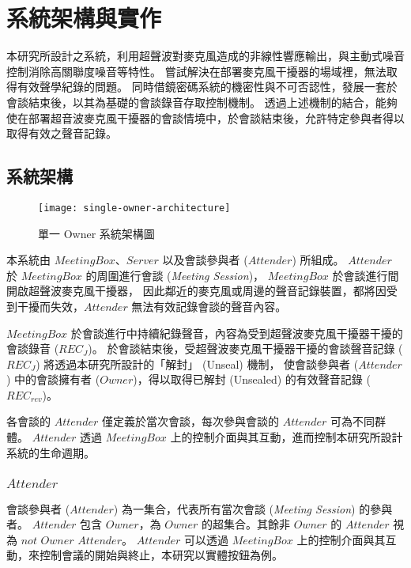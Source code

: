 \chapter{系統架構與實作}

    本研究所設計之系統，利用超聲波對麥克風造成的非線性響應輸出，與主動式噪音控制消除高關聯度噪音等特性。
嘗試解決在部署麥克風干擾器的場域裡，無法取得有效聲學紀錄的問題。
同時借鏡密碼系統的機密性與不可否認性，發展一套於會談結束後，以其為基礎的會談錄音存取控制機制。
透過上述機制的結合，能夠使在部署超音波麥克風干擾器的會談情境中，於會談結束後，允許特定參與者得以取得有效之聲音記錄。


\section{系統架構}

\begin{figure}[H]
    \centering
    \texttt{[image: single-owner-architecture]}
    \caption{單一 Owner 系統架構圖}
    \label{fig.s-o-arch}
\end{figure}

    本系統由 $MeetingBox$、$Server$ 以及會談參與者 ($Attender$) 所組成。
$Attender$ 於 $MeetingBox$ 的周圍進行會談 ({\it Meeting Session})，
$MeetingBox$ 於會談進行間開啟超聲波麥克風干擾器，
因此鄰近的麥克風或周邊的聲音記錄裝置，都將因受到干擾而失效，$Attender$ 無法有效記錄會談的聲音內容。

    $MeetingBox$ 於會談進行中持續紀錄聲音，內容為受到超聲波麥克風干擾器干擾的會談錄音 ($REC_{J}$)。
於會談結束後，受超聲波麥克風干擾器干擾的會談聲音記錄 ($REC_{J}$) 將透過本研究所設計的「解封」 (Unseal) 機制，
使會談參與者 ($Attender$) 中的會談擁有者 ($Owner$)，得以取得已解封 (Unsealed) 的有效聲音記錄 ($REC_{rev}$)。

    各會談的 $Attender$ 僅定義於當次會談，每次參與會談的 $Attender$ 可為不同群體。
$Attender$ 透過 $MeetingBox$ 上的控制介面與其互動，進而控制本研究所設計系統的生命週期。


\subsection{$Attender$}

    會談參與者 ($Attender$) 為一集合，代表所有當次會談 ({\it Meeting Session}) 的參與者。
$Attender$ 包含 $Owner$，為 $Owner$ 的超集合。其餘非 $Owner$ 的 $Attender$ 視為 $not$ $Owner$ $Attender$。
$Attender$ 可以透過 $MeetingBox$ 上的控制介面與其互動，來控制會議的開始與終止，本研究以實體按鈕為例。

